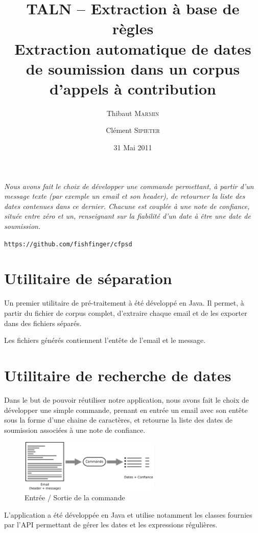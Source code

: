 \documentclass[a4paper,french,10pt]{article}
\title{\textbf{TALN -- Extraction à base de règles\\ \normalsize Extraction automatique de dates de soumission dans un corpus d'appels à contribution}}
\author{Thibaut \textsc{Marmin} \and Clément \textsc{Sipieter}}
\date{31 Mai 2011}
\begin{document}
\maketitle

\emph{Nous avons fait le choix de développer une commande permettant, à partir d'un message texte (par exemple un email et son header), de retourner la liste des dates contenues dans ce dernier. Chacune est couplée à une note de confiance, située entre zéro et un, renseignant sur la fiabilité d'un date à être une date de soumission.}

\begin{center}
\verb+https://github.com/fishfinger/cfpsd+
\end{center}

\section{Utilitaire de séparation}
Un premier utilitaire de pré-traitement à été développé en Java. Il permet, à partir du fichier de corpus complet, d'extraire chaque email et de les exporter dans des fichiers séparés.

Les fichiers générés contiennent l'entête de l'email et le message.

\section{Utilitaire de recherche de dates}
Dans le but de pouvoir réutiliser notre application, nous avons fait le choix de développer une simple commande, prenant en entrée un email avec son entête sous la forme d'une chaine de caractères, et retourne la liste des dates de soumission associées à une note de confiance.

\begin{figure}[H]
\centering
\includegraphics[width=0.6\textwidth]{files/archi}
\caption{Entrée / Sortie de la commande}
\end{figure}

L'application a été développée en Java et utilise notamment les classes fournies par l'API permettant de gérer les dates et les expressions régulières.
\end{document}
